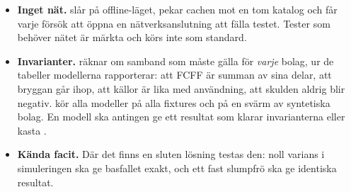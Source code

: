 \begin{itemize}
  \item \textbf{Inget nät.}  slår på offline-läget, pekar cachen mot en tom
    katalog och får varje försök att öppna en nätverksanslutning att fälla testet. Tester som
    behöver nätet är märkta  och körs inte som standard.
  \item \textbf{Invarianter.}  räknar om samband som måste gälla för
    \emph{varje} bolag, ur de tabeller modellerna rapporterar: att FCFF är summan av sina delar,
    att bryggan går ihop, att källor är lika med användning, att skulden aldrig blir negativ.
     kör alla modeller på alla fixtures och på en svärm av
    syntetiska bolag. En modell ska antingen ge ett resultat som klarar invarianterna eller
    kasta .
  \item \textbf{Kända facit.} Där det finns en sluten lösning testas den: noll varians i
    simuleringen ska ge basfallet exakt, och ett fast slumpfrö ska ge identiska resultat.
\end{itemize}
